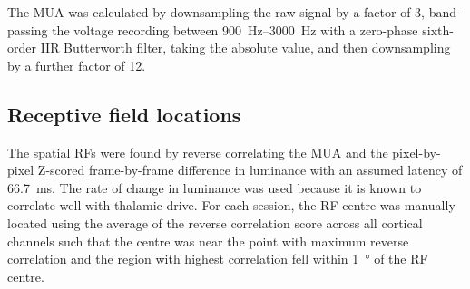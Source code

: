 The \ac{MUA} was calculated by downsampling the raw signal by a factor of \num{3}, band-passing the voltage recording between \SIrange{900}{3000}{Hz} with a zero-phase sixth-order \ac{IIR} Butterworth filter, taking the absolute value, and then downsampling by a further factor of \num{12}.


\subsection{Receptive field locations}
\label{sec:lam_rf}

The spatial \acp{RF} were found by reverse correlating the \ac{MUA} and the pixel-by-pixel Z-scored frame-by-frame difference in luminance with an assumed latency of \SI{66.7}{\milli\second}.
The rate of change in luminance was used because it is known to correlate well with thalamic drive.
For each session, the \ac{RF} centre was manually located using the average of the reverse correlation score across all cortical channels such that the centre was near the point with maximum reverse correlation and the region with highest correlation fell within \SI{1}{\degree} of the \ac{RF} centre.


%
%
%
%


